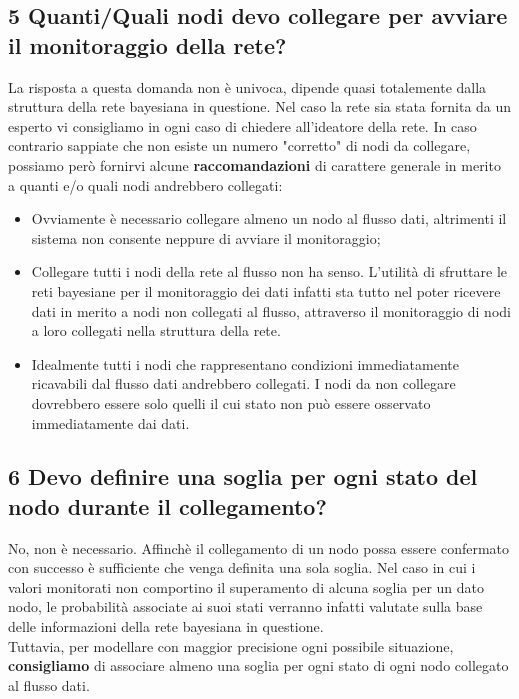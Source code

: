 \subsection*{5 Quanti/Quali nodi devo collegare per avviare il monitoraggio della rete?}
La risposta a questa domanda non è univoca, dipende quasi totalemente dalla struttura della rete bayesiana in questione. Nel caso la rete sia stata fornita da un esperto vi consigliamo in ogni caso di chiedere all'ideatore della rete. In caso contrario sappiate che non esiste un numero "corretto" di nodi da collegare, possiamo però fornirvi alcune \textbf{raccomandazioni} di carattere generale in merito a quanti e/o quali nodi andrebbero collegati:
\begin{itemize}
	\item Ovviamente è necessario collegare almeno un nodo al flusso dati, altrimenti il sistema non consente neppure di avviare il monitoraggio;
	\item Collegare tutti i nodi della rete al flusso non ha senso. L'utilità di sfruttare le reti bayesiane per il monitoraggio dei dati infatti sta tutto nel poter ricevere dati in merito a nodi non collegati al flusso, attraverso il monitoraggio di nodi a loro collegati nella struttura della rete.
	\item Idealmente tutti i nodi che rappresentano condizioni immediatamente ricavabili dal flusso dati andrebbero collegati. I nodi da non collegare dovrebbero essere solo quelli il cui stato non può essere osservato immediatamente dai dati.
\end{itemize}

\subsection*{6 Devo definire una soglia per ogni stato del nodo durante il collegamento?}
No, non è necessario. Affinchè il collegamento di un nodo possa essere confermato con successo è sufficiente che venga definita una sola soglia. Nel caso in cui i valori monitorati non comportino il superamento di alcuna soglia per un dato nodo, le probabilità associate ai suoi stati verranno infatti valutate sulla base delle informazioni della rete bayesiana in questione.\\
Tuttavia, per modellare con maggior precisione ogni possibile situazione, \textbf{consigliamo} di associare almeno una soglia per ogni stato di ogni nodo collegato al flusso dati.

